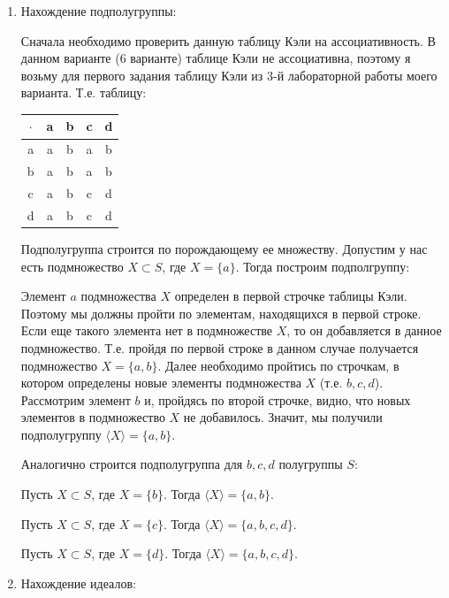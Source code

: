 \documentclass[bachelor, och, labwork]{shiza}
\begin{document}
    \begin{enumerate}
      \item Нахождение подполугруппы:
    
      Сначала необходимо проверить данную таблицу Кэли на ассоциативность. В данном варианте (6 варианте) таблице Кэли не ассоциативна, поэтому
      я возьму для первого задания таблицу Кэли из 3-й лабораторной работы моего варианта. Т.е. таблицу:

      \begin{table}[H]
        \centering
        \begin{tabular}{|c|c|c|c|c|}
        \hline
        $\cdot$ & a & b & c & d \\ \hline
        a & a & b & a & b \\ \hline
        b & a & b & a & b \\ \hline
        c & a & b & c & d \\ \hline
        d & a & b & c & d \\ \hline
    \end{tabular}
    \end{table}

      Подполугруппа строится по порождающему ее множеству. Допустим у нас есть подмножество $X \subset S$, где $X = \{ a\}$. 
      Тогда построим подполгруппу:
  
      Элемент $a$ подмножества $X$ определен в первой строчке таблицы Кэли. Поэтому мы должны пройти по элементам, находящихся в первой
      строке. Если еще такого элемента нет в подмножестве $X$, то он добавляется в данное подмножество. Т.е. пройдя по первой строке в
      данном случае получается подмножество $X = \{a, b\}$. Далее необходимо пройтись по строчкам, в котором определены новые элементы
      подмножества $X$ (т.е. $b, c, d$). Рассмотрим элемент $b$ и, пройдясь по второй строчке, видно, что новых элементов в подмножество $X$
      не добавилось. Значит, мы получили подполугруппу $\langle X \rangle = \{a, b\}$.  
    
      Аналогично строится подполугруппа для $b,c,d$ полугруппы $S$:

      Пусть $X \subset S$, где $X = \{b\}$. Тогда $\langle X \rangle = \{a, b\}$.

      Пусть $X \subset S$, где $X = \{c\}$. Тогда $\langle X \rangle = \{a, b, c, d\}$.

      Пусть $X \subset S$, где $X = \{d\}$. Тогда $\langle X \rangle = \{a, b, c, d\}$.
      
      \item Нахождение идеалов:
      

\end{enumerate}
\end{document}
